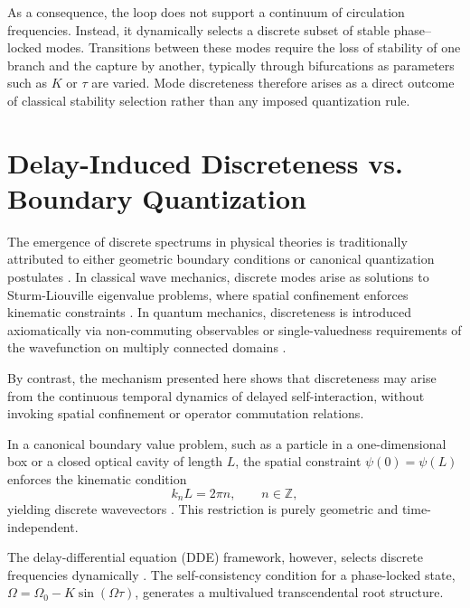 \documentclass[11pt]{article}
\begin{document}
        As a consequence, the loop does not support a continuum of circulation frequencies. Instead, it dynamically selects a discrete subset of stable phase--locked modes. Transitions between these modes require the loss of stability of one branch and the capture by another, typically through bifurcations as parameters such as $K$ or $\tau$ are varied. Mode discreteness therefore arises as a direct outcome of classical stability selection rather than any imposed quantization rule.

    \section{Delay-Induced Discreteness vs. Boundary Quantization}

        The emergence of discrete spectrums in physical theories is traditionally attributed to either geometric boundary conditions or canonical quantization postulates \cite{Zettl2005,Griffiths2018}.
        In classical wave mechanics, discrete modes arise as solutions to Sturm-Liouville eigenvalue problems, where spatial confinement enforces kinematic constraints \cite{Zettl2005}.
        In quantum mechanics, discreteness is introduced axiomatically via non-commuting observables or single-valuedness requirements of the wavefunction on multiply connected domains \cite{Griffiths2018}.

        By contrast, the mechanism presented here shows that discreteness may arise from the continuous temporal dynamics of delayed self-interaction, without invoking spatial confinement or operator commutation relations.

        In a canonical boundary value problem, such as a particle in a one-dimensional box or a closed optical cavity of length $L$, the spatial constraint $\psi(0)=\psi(L)$ enforces the kinematic condition
        \begin{equation}
            k_n L = 2\pi n, \qquad n\in\mathbb{Z},
            \label{eq:kinematic_condition}
        \end{equation}
        yielding discrete wavevectors \cite{Griffiths2018,Siegman1986}. This restriction is purely geometric and time-independent.

        The delay-differential equation (DDE) framework, however, selects discrete frequencies dynamically \cite{Hale1993,Diekmann1995,Erneux2009}.
        The self-consistency condition for a phase-locked state, $\Omega = \Omega_0 - K \sin(\Omega \tau)$, generates a multivalued transcendental root structure.
\end{document}
